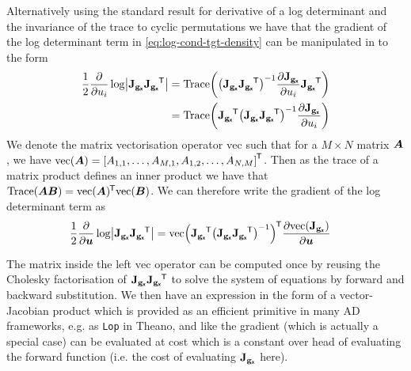 Alternatively using the standard result for derivative of a log determinant and the invariance of the trace to cyclic permutations we have that the gradient of the log determinant term in \eqref{eq:log-cond-tgt-density} can be manipulated in to the form
\begin{align}
    \frac{1}{2} \pd{}{u_i} \log\left| 
      \jacobian{\genfunc_{\rvct{x}}}\jacobian{\genfunc_{\rvct{x}}}\phantom{}\tr
    \right| &=
    \trace\lpa
      \lpa \jacobian{\genfunc_{\rvct{x}}} \jacobian{\genfunc_{\rvct{x}}}\phantom{}\tr\rpa^{-1}
      \pd{\jacobian{\genfunc_{\rvct{x}}}}{u_i}
      \jacobian{\genfunc_{\rvct{x}}}\phantom{}\tr
    \rpa\\
    &=
    \trace\lpa
      \jacobian{\genfunc_{\rvct{x}}}\phantom{}\tr
      \lpa \jacobian{\genfunc_{\rvct{x}}} \jacobian{\genfunc_{\rvct{x}}}\phantom{}\tr\rpa^{-1}
      \pd{\jacobian{\genfunc_{\rvct{x}}}}{u_i}
    \rpa
\end{align}
We denote the matrix vectorisation operator $\textrm{vec}$ such that for a $M\times N$ matrix $\boldsymbol{A}$, we have $\textrm{vec}(\mtx{A}) = \lsb A_{1,1},\dots,A_{M,1}, A_{1,2},\dots,A_{N,M}\rsb\tr$. Then as the trace of a matrix product defines an inner product we have that $\operatorname{Trace}(\boldsymbol{A}\boldsymbol{B}) = \textrm{vec}(\boldsymbol{A})^{\mkern-1.5mu\mathsf{T}}\textrm{vec}(\boldsymbol{B})$. We can therefore write the gradient of the log determinant term as
\begin{align}
    \frac{1}{2} \pd{}{\vct{u}} \log\left| 
      \jacobian{\genfunc_{\rvct{x}}}\jacobian{\genfunc_{\rvct{x}}}\phantom{}\tr 
    \right| &=
    \textrm{vec}\lpa
      \jacobian{\genfunc_{\rvct{x}}}\phantom{}\tr
      \lpa \jacobian{\genfunc_{\rvct{x}}}\jacobian{\genfunc_{\rvct{x}}}\phantom{}\tr\rpa^{-1}
    \rpa\tr
    \pd{
    \textrm{vec}\lpa
      \jacobian{\genfunc_{\rvct{x}}}
    \rpa
    }
    {\vct{u}}
\end{align}

The matrix inside the left $\textrm{vec}$ operator can be computed once by reusing the Cholesky factorisation of $\mathbf{J}_{{\mathbf{g}}_{\boldsymbol{\mathsf{x}}}}\mathbf{J}_{{\mathbf{g}}_{\boldsymbol{\mathsf{x}}}}\phantom{}^{\mkern-1.5mu\mathsf{T}}$  to solve the system of equations by forward and backward substitution. We then have an expression in the form of a vector-Jacobian product which is provided as an efficient primitive in many \ac{AD} frameworks, e.g. as \texttt{Lop} in Theano, and like the gradient (which is actually a special case) can be evaluated at cost which is a constant over head of evaluating the forward function (i.e. the cost of evaluating $\mathbf{J}_{{\mathbf{g}}_{\boldsymbol{\mathsf{x}}}}$ here).

